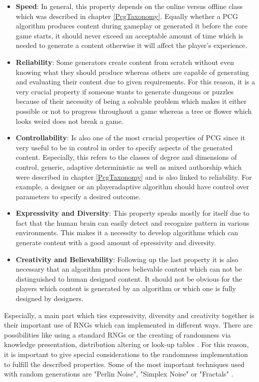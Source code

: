\documentclass[MGS,Master,english]{twbook}%
\begin{document}
\begin{itemize}
	\item \textbf{Speed}: In general, this property depends on the online versus offline class which was described in chapter \ref{PcgTaxonomy}. Equally whether a PCG algorithm produces content during gameplay or generated it before the core game starts, it should never exceed an acceptable amount of time which is needed to generate a content otherwise it will affect the player's experience. \cite{pcg::book}
	\item \textbf{Reliability}: Some generators create content from scratch without even knowing what they should produce whereas others are capable of generating and evaluating their content due to given requirements. For this reason, it is a very crucial property if someone wants to generate dungeons or puzzles because of their necessity of being a solvable problem which makes it either possible or not to progress throughout a game whereas a tree or flower which looks weird does not break a game. \cite{pcg::book}
	\item \textbf{Controllability}: Is also one of the most crucial properties of PCG since it very useful to be in control in order to specify aspects of the generated content. Especially, this refers to the classes of degree and dimensions of control, generic, adaptive deterministic as well as mixed authorship which were described in chapter \ref{PcgTaxonomy} and is also linked to reliability. For example, a designer or an playeradaptive algorithm should have control over parameters to specify a desired outcome. \cite{pcg::book}
	\item \textbf{Expressivity and Diversity}: This property speaks mostly for itself due to fact that the human brain can easily detect and recognize pattern in various environments. This makes it a necessity to develop algorithms which can generate content with a good amount of epressivity and diversity. \cite{pcg::book}
	\item \textbf{Creativity and Believability}: Following up the last property it is also necessary that an algorithm produces believable content which can not be distinguished to human designed content. It should not be obvious for the players which content is generated by an algorithm or which one is fully designed by designers. \cite{pcg::book}
\end{itemize}
Especially, a main part which ties expressivity, diversity and creativity together is their important use of \ac{RNG}s which can implemented in different ways. There are possibilities like using a standard RNGs or the creating of randomness via knowledge presentation, distribution altering or look-up tables \cite{pcg::book}. For this reason, it is important to give special considerations to the randomness implementation to fulfill the described properties. Some of the most important techniques used with random generations are "Perlin Noise", "Simplex Noise" or "Fractals" \cite{pcg::shortHistoryOfDynamicAndPCG}.\\
\end{document}
